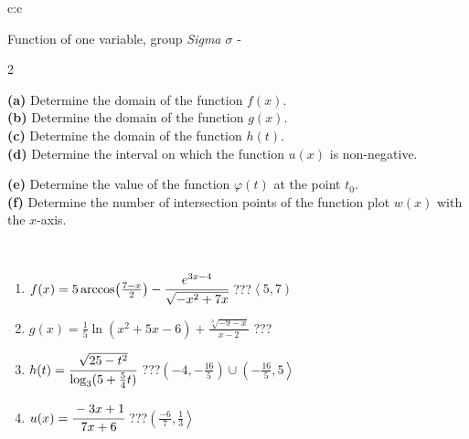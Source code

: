 \documentclass[10pt]{report}
\begin{document}
\begin{tabular}{c:c}
\begin{minipage}[c][104.5mm][t]{0.5\linewidth}
\begin{center}
\vspace{7mm}
{\huge Function of one variable, group \textit{Sigma $\sigma$} -}\\[5mm]
\begin{minipage}{0.95\linewidth}
\begin{center}
{\small \begin{multicols}{2} \raggedright
\textbf{(a)} Determine the domain of the function \(f(x)\). \\[1mm]
\textbf{(b)} Determine the domain of the function \(g(x)\). \\[1mm]
\textbf{(c)} Determine the domain of the function \(h(t)\). \\[1mm]
\textbf{(d)} Determine the interval on which the function \(u(x)\) is non-negative. \par \columnbreak
\textbf{(e)} Determine the value of the function \(\varphi(t)\) at the point \(t_0\). \\[1mm]
\textbf{(f)} Determine the number of intersection points of the function plot \(w(x)\) with the \(x\)-axis. \\[1mm]
\end{multicols}
}
\end{center}
\end{minipage}
\\[4mm]
\begin{minipage}{0.79\linewidth}
\begin{center}
\begin{varwidth}{\linewidth}
\begin{enumerate}
\small
\item $f(x) = 5\arccos\!\left( \frac{7-x}{2} \right) - \cfrac{e^{3x-4}}{\sqrt{-x^2+7x}}$\quad \dotfill\; ???\;\dotfill \quad $\left\langle5 , 7\right)$
\item $g(x) = \frac{1}{5} \ln{\!(x^2+5x-6)}+\frac{\sqrt[3]{-9-x}}{x-2}$\quad \dotfill\; ???\;\dotfill {}
\item $h(t) = \cfrac{\sqrt{25-t^2}}{\log_3(5+\frac{5}{4}t)}$\quad \dotfill\; ???\;\dotfill \quad $\left(-4 , -\frac{16}{5}\right)\cup\left(-\frac{16}{5} , 5\right\rangle$
\item $u(x) = \cfrac{-3x+1}{7x+6}$\quad \dotfill\; ???\;\dotfill \quad $\left(\frac{-6}{7} , \frac{1}{3}\right\rangle$

\end{enumerate}
\end{varwidth}
\end{center}
\end{minipage}
\end{center}
\end{minipage}
\end{tabular}
\end{document}
